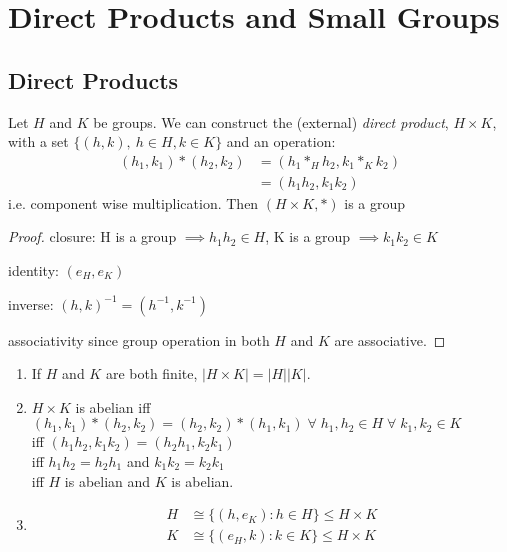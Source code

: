 \section{Direct Products and Small Groups}

\subsection{Direct Products}

\begin{definition}
  Let $H$ and $K$ be groups. We can construct the (external) \emph{direct product}, $H \times K$, with a set $\{ (h, k),\ h \in H, k \in K \}$ and an operation:
  \begin{align*}
    (h_1, k_1) * (h_2, k_2) &= (h_1 *_H h_2, k_1 *_K k_2) \\
    &= (h_1 h_2, k_1 k_2)
  \end{align*} i.e. component wise multiplication. 
  Then $(H \times K, *)$ is a group
\end{definition}

\begin{proof} \mbox{}
closure: H is a group $\implies h_1 h_2 \in H$, K is a group $\implies k_1 k_2 \in K$

identity: $(e_H, e_K)$

inverse: $(h, k)^{-1} = (h^{-1}, k^{-1})$

associativity since group operation in both $H$ and $K$ are associative.
\end{proof} 


\begin{remark} \mbox{}
  \begin{enumerate}
    \item If $H$ and $K$ are both finite, $| H \times K| = |H| |K|$.
    \item $H \times K$ is abelian iff $(h_1, k_1) * (h_2, k_2) = (h_2, k_2) * (h_1, k_1) \; \forall \; h_1, h_2 \in H \; \forall \; k_1, k_2 \in K$ \\
    iff $(h_1 h_2, k_1 k_2) = (h_2 h_1, k_2 k_1)$ \\
    iff $h_1 h_2 = h_2 h_1$ and $k_1 k_2 = k_2 k_1$ \\
    iff $H$ is abelian and $K$ is abelian.
    \item \begin{align*}
      H &\cong \{ (h, e_K) : h \in H \} \leq H \times K \\
      K &\cong \{ (e_H, k) : k \in K \} \leq H \times K
    \end{align*}
  \end{enumerate}
\end{remark} 

